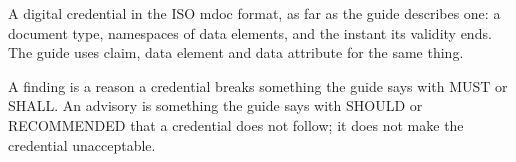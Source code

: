 \begin{definition}[Credential]
  \label{def:mdoc}
  A digital credential in the ISO mdoc format, as far as the guide describes
  one: a document type, namespaces of data elements, and the instant its
  validity ends.  The guide uses claim, data element and data attribute for
  the same thing.
\end{definition}

\begin{definition}
  \label{def:finding}
  A finding is a reason a credential breaks something the guide says with
  MUST or SHALL.  An advisory is something the guide says with SHOULD or
  RECOMMENDED that a credential does not follow; it does not make the
  credential unacceptable.
\end{definition}












